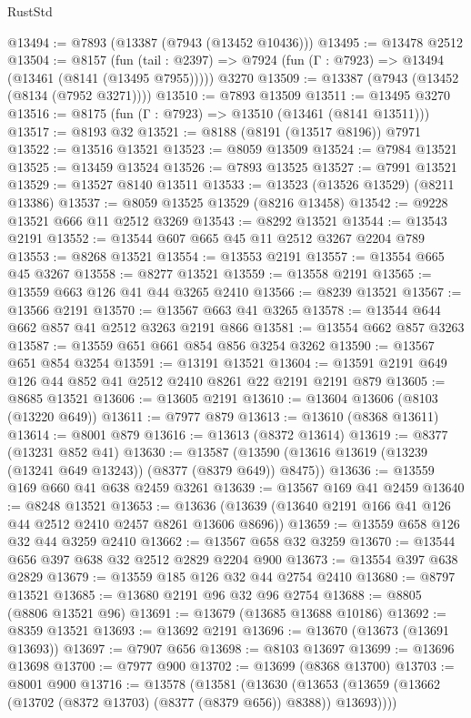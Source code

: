\begin{lexlean}{RustStd}
\begin{coremodule}
{\begin{coremodule}
{{{{{{{{{{{{{{{{{{{{{{{{{{{{{{{{{{{{{{{{{{{{{{{{{{@13494 := @7893 (@13387 (@7943 (@13452 @10436)))
@13495 := @13478 @2512
@13504 := @8157
    (fun (tail : @2397) => @7924 (fun (Γ : @7923) => @13494 (@13461 (@8141 (@13495 @7955)))))
    @3270
@13509 := @13387 (@7943 (@13452 (@8134 (@7952 @3271))))
@13510 := @7893 @13509
@13511 := @13495 @3270
@13516 := @8175 (fun (Γ : @7923) => @13510 (@13461 (@8141 @13511)))
@13517 := @8193 @32
@13521 := @8188 (@8191 (@13517 @8196)) @7971
@13522 := @13516 @13521
@13523 := @8059 @13509
@13524 := @7984 @13521
@13525 := @13459 @13524
@13526 := @7893 @13525
@13527 := @7991 @13521
@13529 := @13527 @8140 @13511
@13533 := @13523 (@13526 @13529) (@8211 @13386)
@13537 := @8059 @13525 @13529 (@8216 @13458)
@13542 := @9228 @13521 @666 @11 @2512 @3269
@13543 := @8292 @13521
@13544 := @13543 @2191
@13552 := @13544 @607 @665 @45 @11 @2512 @3267 @2204 @789
@13553 := @8268 @13521
@13554 := @13553 @2191
@13557 := @13554 @665 @45 @3267
@13558 := @8277 @13521
@13559 := @13558 @2191
@13565 := @13559 @663 @126 @41 @44 @3265 @2410
@13566 := @8239 @13521
@13567 := @13566 @2191
@13570 := @13567 @663 @41 @3265
@13578 := @13544 @644 @662 @857 @41 @2512 @3263 @2191 @866
@13581 := @13554 @662 @857 @3263
@13587 := @13559 @651 @661 @854 @856 @3254 @3262
@13590 := @13567 @651 @854 @3254
@13591 := @13191 @13521
@13604 := @13591 @2191 @649 @126 @44 @852 @41 @2512 @2410 @8261 @22 @2191 @2191 @879
@13605 := @8685 @13521
@13606 := @13605 @2191
@13610 := @13604 @13606 (@8103 (@13220 @649))
@13611 := @7977 @879
@13613 := @13610 (@8368 @13611)
@13614 := @8001 @879
@13616 := @13613 (@8372 @13614)
@13619 := @8377 (@13231 @852 @41)
@13630 := @13587 (@13590 (@13616 @13619 (@13239 (@13241 @649 @13243)) (@8377 (@8379 @649)) @8475))
@13636 := @13559 @169 @660 @41 @638 @2459 @3261
@13639 := @13567 @169 @41 @2459
@13640 := @8248 @13521
@13653 := @13636 (@13639 (@13640 @2191 @166 @41 @126 @44 @2512 @2410 @2457 @8261 @13606 @8696))
@13659 := @13559 @658 @126 @32 @44 @3259 @2410
@13662 := @13567 @658 @32 @3259
@13670 := @13544 @656 @397 @638 @32 @2512 @2829 @2204 @900
@13673 := @13554 @397 @638 @2829
@13679 := @13559 @185 @126 @32 @44 @2754 @2410
@13680 := @8797 @13521
@13685 := @13680 @2191 @96 @32 @96 @2754
@13688 := @8805 (@8806 @13521 @96)
@13691 := @13679 (@13685 @13688 @10186)
@13692 := @8359 @13521
@13693 := @13692 @2191
@13696 := @13670 (@13673 (@13691 @13693))
@13697 := @7907 @656
@13698 := @8103 @13697
@13699 := @13696 @13698
@13700 := @7977 @900
@13702 := @13699 (@8368 @13700)
@13703 := @8001 @900
@13716 := @13578
    (@13581
      (@13630 (@13653 (@13659 (@13662 (@13702 (@8372 @13703) (@8377 (@8379 @656)) @8388)) @13693))))
}}}}}}}}}}}}}}}}}}}}}}}}}}}}}}}}}}}}}}}}}}}}}}}}}}
\end{coremodule}}
\end{coremodule}
\end{lexlean}
